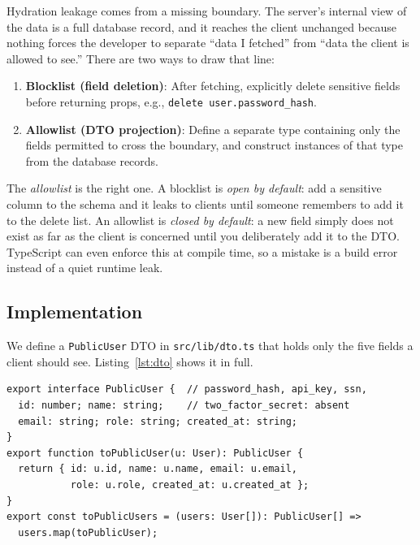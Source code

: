 \documentclass[runningheads]{llncs}
\begin{document}
Hydration leakage comes from a missing boundary.  The server's internal
view of the data is a full database record, and it reaches the client
unchanged because nothing forces the developer to separate ``data I
fetched'' from ``data the client is allowed to see.''  There are two ways
to draw that line:

\begin{enumerate}
  \item \textbf{Blocklist (field deletion)}: After fetching, explicitly
        delete sensitive fields before returning props, e.g.,
        \texttt{delete user.password\_hash}.

  \item \textbf{Allowlist (DTO projection)}: Define a separate type
        containing only the fields permitted to cross the boundary, and
        construct instances of that type from the database records.
\end{enumerate}

The \emph{allowlist} is the right one.  A blocklist is \emph{open by
default}: add a sensitive column to the schema and it leaks to clients
until someone remembers to add it to the delete list.  An allowlist is
\emph{closed by default}: a new field simply does not exist as far as the
client is concerned until you deliberately add it to the DTO.  TypeScript
can even enforce this at compile time, so a mistake is a build error
instead of a quiet runtime leak.

\subsection{Implementation}

We define a \texttt{PublicUser} DTO in \texttt{src/lib/dto.ts} that holds
only the five fields a client should see.  Listing~\ref{lst:dto} shows it
in full.

\begin{lstlisting}[style=typescript, caption={DTO definition and
  transformation function in \texttt{src/lib/dto.ts}.},
  label={lst:dto}]
export interface PublicUser {  // password_hash, api_key, ssn,
  id: number; name: string;    // two_factor_secret: absent
  email: string; role: string; created_at: string;
}
export function toPublicUser(u: User): PublicUser {
  return { id: u.id, name: u.name, email: u.email,
           role: u.role, created_at: u.created_at };
}
export const toPublicUsers = (users: User[]): PublicUser[] =>
  users.map(toPublicUser);
\end{lstlisting}
\end{document}
